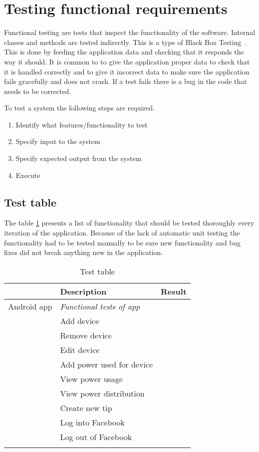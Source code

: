 \section{Testing functional requirements}
\label{sec:funcTest}
Functional testing are tests that inspect the functionality of the software. Internal classes and methods are tested indirectly. This is a type of Black Box Testing~\cite{blackbox}. This is done by feeding the application data and checking that it responds the way it should. It is common to to give the application proper data to check that it is handled correctly and to give it incorrect data to make sure the application fails gracefully and does not crash. If a test fails there is a bug in the code that needs to be corrected.

To test a system the following steps are required.
\begin{enumerate}
\item Identify what features/functionality to test
\item Specify input to the system
\item Specify expected output from the system
\item Execute
\end{enumerate}

\subsection{Test table}
The table \ref{tab:testTable} presents a list of functionality that should be tested thoroughly every iteration of the application. Because of the lack of automatic unit testing the functionality had to be tested manually to be sure new functionality and bug fixes did not break anything new in the application.

\begin{table}[H]
\begin{tabular}{|l|l|l|}
\hline
\rowcolor{darkgray} & \textbf{Description} & \textbf{Result}\\\hline \arrayrulecolor{lightgray}
\rowcolors{0}{darkgray}{lightgray}
Android app & \textit{Functional tests of app} &  \\ \cline{1-2}\cline{2-3}
&Add device&\\ \cline{1-2}\cline{2-3}
&Remove device&\\ \cline{1-2}\cline{2-3}
&Edit device&\\ \cline{1-2}\cline{2-3}
&Add power used for device&\\ \cline{1-2}\cline{2-3}
&View power usage&\\ \cline{1-2}\cline{2-3}
&View power distribution&\\ \cline{1-2}\cline{2-3}
&Create new tip&\\ \cline{1-2}\cline{2-3}
&Log into Facebook&\\ \cline{1-2}\cline{2-3}
&Log out of Facebook&\\\arrayrulecolor{black}
\hline
\end{tabular}
\caption{Test table}
\label{tab:testTable}
\end{table}
